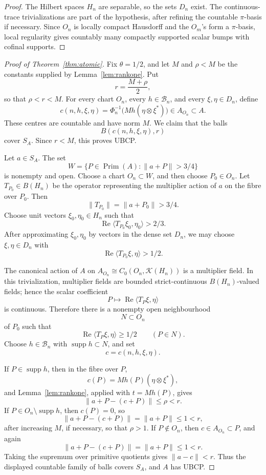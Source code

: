 \documentclass[11pt]{article}
\newcommand{\Kcal}{\mathcal K}
\newcommand{\Prim}{\operatorname{Prim}}
\newcommand{\supp}{\operatorname{supp}}
\begin{document}
\begin{proof}
The Hilbert spaces \(H_n\) are separable, so the sets \(D_n\) exist.  The
continuous-trace trivializations are part of the hypothesis, after refining
the countable \(\pi\)-basis if necessary.  Since \(O_n\) is locally compact
Hausdorff and the \(O_m\)'s form a \(\pi\)-basis, local regularity gives
countably many compactly supported scalar bumps with cofinal supports.
\end{proof}

\begin{proof}[Proof of Theorem~\ref{thm:atomic}]
Fix \(\theta=1/2\), and let \(M\) and \(\rho<M\) be the constants supplied by
Lemma~\ref{lem:rankone}.  Put
\[
        r=\frac{M+\rho}{2},
\]
so that \(\rho<r<M\).  For every chart \(O_n\), every
\(h\in\mathcal B_n\), and every \(\xi,\eta\in D_n\), define
\[
        c(n,h,\xi,\eta)
        =
        \Phi_n^{-1}\bigl(Mh(\eta\otimes\xi^*)\bigr)
        \in A_{O_n}\subset A.
\]
These centres are countable and have norm \(M\).  We claim that the balls
\[
        B(c(n,h,\xi,\eta),r)
\]
cover \(S_A\).  Since \(r<M\), this proves UBCP.

Let \(a\in S_A\).  The set
\[
        W=\{P\in\Prim(A):\|a+P\|>3/4\}
\]
is nonempty and open.  Choose a chart \(O_n\subset W\), and then choose
\(P_0\in O_n\).  Let \(T_{P_0}\in B(H_n)\) be the operator representing the
multiplier action of \(a\) on the fibre over \(P_0\).  Then
\[
        \|T_{P_0}\|=\|a+P_0\|>3/4.
\]
Choose unit vectors \(\xi_0,\eta_0\in H_n\) such that
\[
        \operatorname{Re}\langle T_{P_0}\xi_0,\eta_0\rangle>2/3.
\]
After approximating \(\xi_0,\eta_0\) by vectors in the dense set \(D_n\), we
may choose \(\xi,\eta\in D_n\) with
\[
        \operatorname{Re}\langle T_{P_0}\xi,\eta\rangle>1/2.
\]

The canonical action of \(A\) on \(A_{O_n}\cong C_0(O_n,\Kcal(H_n))\) is a
multiplier field.  In this trivialization, multiplier fields are bounded
strict-continuous \(B(H_n)\)-valued fields; hence the scalar coefficient
\[
        P\longmapsto
        \operatorname{Re}\langle T_P\xi,\eta\rangle
\]
is continuous.  Therefore there is a nonempty open neighbourhood
\[
        N\subset O_n
\]
of \(P_0\) such that
\[
        \operatorname{Re}\langle T_P\xi,\eta\rangle\ge1/2
        \qquad(P\in N).
\]
Choose \(h\in\mathcal B_n\) with \(\supp h\subset N\), and set
\[
        c=c(n,h,\xi,\eta).
\]

If \(P\in\supp h\), then in the fibre over \(P\),
\[
        c(P)=Mh(P)(\eta\otimes\xi^*),
\]
and Lemma~\ref{lem:rankone}, applied with \(t=Mh(P)\), gives
\[
        \|a+P-(c+P)\|\le\rho<r.
\]
If \(P\in O_n\setminus\supp h\), then \(c(P)=0\), so
\[
        \|a+P-(c+P)\|=\|a+P\|\le1<r,
\]
after increasing \(M\), if necessary, so that \(\rho>1\).  If
\(P\notin O_n\), then \(c\in A_{O_n}\subset P\), and again
\[
        \|a+P-(c+P)\|=\|a+P\|\le1<r.
\]
Taking the supremum over primitive quotients gives \(\|a-c\|<r\).  Thus
the displayed countable family of balls covers \(S_A\), and \(A\) has UBCP.
\end{proof}
\end{document}
